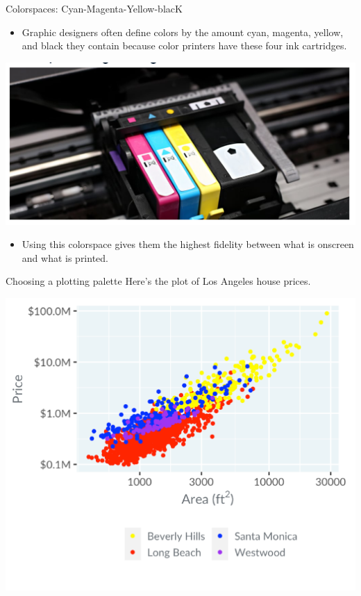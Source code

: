 \documentclass[
  ignorenonframetext,
]{beamer}
\providecommand{\tightlist}{%
  \setlength{\itemsep}{0pt}\setlength{\parskip}{0pt}}
\begin{document}
\begin{frame}{Colorspaces: Cyan-Magenta-Yellow-blacK}
\label{colorspaces-cyan-magenta-yellow-black}
\begin{itemize}
\tightlist
\item
  Graphic designers often define colors by the amount cyan, magenta,
  yellow, and black they contain because color printers have these four
  ink cartridges.
\end{itemize}

\includegraphics{../images/im76.png}

\begin{itemize}
\tightlist
\item
  Using this colorspace gives them the highest fidelity between what is
  onscreen and what is printed.
\end{itemize}
\end{frame}

\begin{frame}{Choosing a plotting palette}
\label{choosing-a-plotting-palette}
Here's the plot of Los Angeles house prices.

\includegraphics{../images/im77.png}
\end{frame}
\end{document}
